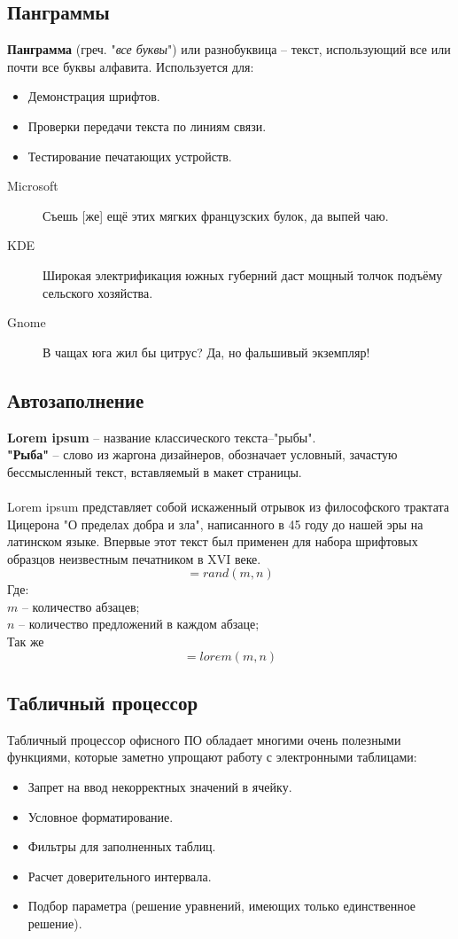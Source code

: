 \subsection{Панграммы}
\textbf{Панграмма} (греч. "\emph{все буквы}") или разнобуквица -- текст, использующий все или почти все буквы алфавита.
Используется для:
\begin{itemize}
  \item Демонстрация шрифтов.
  \item Проверки передачи текста по линиям связи.
  \item Тестирование печатающих устройств.
\end{itemize}
\begin{description}
  \item[Microsoft] Съешь [же] ещё этих мягких французских булок, да выпей чаю.
  \item[KDE] Широкая электрификация южных губерний даст мощный толчок подъёму сельского хозяйства.
  \item[Gnome] В чащах юга жил бы цитрус? Да, но фальшивый экземпляр!
\end{description}
\subsection{Автозаполнение}
\textbf{Lorem ipsum} -- название классического текста--"рыбы".
\\\textbf{"Рыба"} -- слово из жаргона дизайнеров, обозначает условный, зачастую бессмысленный текст, вставляемый в макет страницы.
\\
\\Lorem ipsum представляет собой искаженный отрывок из философского трактата Цицерона "О пределах добра и зла", написанного в 45 году до нашей эры на латинском языке. Впервые этот текст был применен для набора шрифтовых образцов неизвестным печатником в XVI веке.
\\
$$=rand(m, n)$$
Где:
\\$m$ – количество абзацев;
\\$n$ – количество предложений в каждом абзаце;
\\Так же
$$=lorem(m, n)$$
\subsection{Табличный процессор}
Табличный процессор офисного ПО обладает многими очень полезными функциями, которые заметно упрощают работу с электронными таблицами:
\begin{itemize}
  \item Запрет на ввод некорректных значений в ячейку.
  \item Условное форматирование.
  \item Фильтры для заполненных таблиц.
  \item Расчет доверительного интервала.
  \item Подбор параметра (решение уравнений, имеющих только единственное решение).
\end{itemize}
